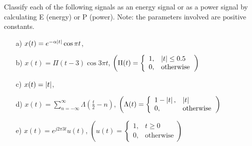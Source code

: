 \documentclass{assignment}
\begin{document}
\begin{prob}[15 pts]
    Classify each of the following signals as an energy signal or as a power signal by calculating E (energy) or P (power). Note: the parameters involved are positive constants.
    \begin{itemize}
        \item[a)] $x(t)=e^{-\alpha\left\lvert t\right\rvert}\cos\pi t$,
        \item[b)] $x(t)=\Pi(t-3)\cos 3\pi t$, $\left(\Pi(t)=\left\{\begin{array}{ll}1,&\left\lvert t\right\rvert\leq 0.5\\0,&\text{otherwise}\end{array}\right.\right)$
        \item[c)] $x(t)=\left\lvert t\right\rvert$,
        \item[d)] $x(t)=\sum_{n=-\infty}^{\infty}\Lambda(\frac{t}{2}-n)$, $\left(\Lambda(t)=\left\{\begin{array}{ll}1-\left\lvert t\right\rvert,&\left\lvert t\right\rvert\\0,&\text{otherwise}\end{array}\right.\right)$
        \item[e)] $x(t)=e^{j2\pi 3t}u(t)$, $\left(u(t)=\left\{\begin{array}{ll}1,&t\geq 0\\0,&\text{otherwise}\end{array}\right.\right)$
    \end{itemize}
\end{prob}
\end{document}
